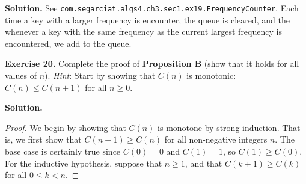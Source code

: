 \documentclass[12pt, a4paper]{article}
\newenvironment{ex}[2][Exercise]
{\par\medskip\noindent \textbf{#1 #2.}}
{\medskip}
\newenvironment{sol}[1][Solution]
{\par\medskip\noindent \textbf{#1.} }
{\medskip}
\begin{document}
	\begin{sol}
		See \texttt{com.segarciat.algs4.ch3.sec1.ex19.FrequencyCounter}. Each time a key with
		a larger frequency is encounter, the queue is cleared, and the whenever a key
		with the same frequency as the current largest frequency is encountered, we add
		to the queue.
	\end{sol}
	\begin{ex}{20}
		Complete the proof of \textbf{Proposition B} (show that it holds for all values
		of $n$). \emph{Hint}: Start by showing that $C(n)$ is monotonic: $C(n)\leq C(n+1)$
		for all $n\geq 0$.
	\end{ex}
	\begin{sol}
		\begin{proof}
			We begin by showing that $C(n)$ is monotone by strong induction. That is, we first
			show that $C(n+1)\geq C(n)$ for all non-negative integers $n$. The base
			case is certainly true since $C(0)=0$ and $C(1)=1$, so $C(1)\geq C(0)$.
			For the inductive hypothesis, suppose that $n\geq 1$, and that $C(k+1)\geq C(k)$
			for all $0\leq k< n$.
			

\end{proof}
\end{sol}
\end{document}
